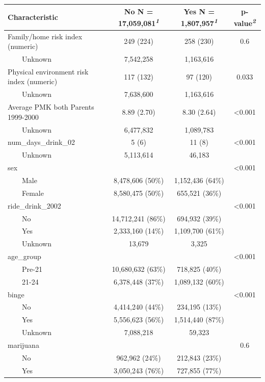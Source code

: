 \documentclass[
]{article}
\begin{document}
\begin{table}[t]
\fontsize{12.0pt}{14.0pt}\selectfont
\begin{tabular*}{\linewidth}{@{\extracolsep{\fill}}lccc}
\toprule
\textbf{Characteristic} & \textbf{No}  N = 17,059,081\textsuperscript{\textit{1}} & \textbf{Yes}  N = 1,807,957\textsuperscript{\textit{1}} & \textbf{p-value}\textsuperscript{\textit{2}} \\ 
\midrule\addlinespace[2.5pt]
Family/home risk index (numeric) & 249 (224) & 258 (230) & 0.6 \\ 
    Unknown & 7,542,258 & 1,163,616 &  \\ 
Physical environment risk index (numeric) & 117 (132) & 97 (120) & 0.033 \\ 
    Unknown & 7,638,600 & 1,163,616 &  \\ 
Average PMK both Parents 1999-2000 & 8.89 (2.70) & 8.30 (2.64) & <0.001 \\ 
    Unknown & 6,477,832 & 1,089,783 &  \\ 
num\_days\_drink\_02 & 5 (6) & 11 (8) & <0.001 \\ 
    Unknown & 5,113,614 & 46,183 &  \\ 
sex &  &  & <0.001 \\ 
    Male & 8,478,606 (50\%) & 1,152,436 (64\%) &  \\ 
    Female & 8,580,475 (50\%) & 655,521 (36\%) &  \\ 
ride\_drink\_2002 &  &  & <0.001 \\ 
    No & 14,712,241 (86\%) & 694,932 (39\%) &  \\ 
    Yes & 2,333,160 (14\%) & 1,109,700 (61\%) &  \\ 
    Unknown & 13,679 & 3,325 &  \\ 
age\_group &  &  & <0.001 \\ 
    Pre-21 & 10,680,632 (63\%) & 718,825 (40\%) &  \\ 
    21-24 & 6,378,448 (37\%) & 1,089,132 (60\%) &  \\ 
binge &  &  & <0.001 \\ 
    No & 4,414,240 (44\%) & 234,195 (13\%) &  \\ 
    Yes & 5,556,623 (56\%) & 1,514,440 (87\%) &  \\ 
    Unknown & 7,088,218 & 59,323 &  \\ 
marijuana &  &  & 0.6 \\ 
    No & 962,962 (24\%) & 212,843 (23\%) &  \\ 
    Yes & 3,050,243 (76\%) & 727,855 (77\%) &  \\ 

\end{tabular*}
\end{table}
\end{document}

